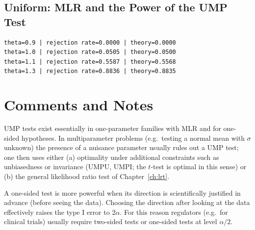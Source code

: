 \documentclass[main.tex]{subfiles}
\begin{document}
\subsection{Uniform: MLR and the Power of the UMP Test}

\begin{lstlisting}[style=output]
theta=0.9 | rejection rate=0.0000 | theory=0.0000
theta=1.0 | rejection rate=0.0505 | theory=0.0500
theta=1.1 | rejection rate=0.5587 | theory=0.5568
theta=1.3 | rejection rate=0.8836 | theory=0.8835
\end{lstlisting}

\section{Comments and Notes}

\begin{remark}
UMP tests exist essentially in one-parameter families with MLR and for one-sided hypotheses. In multiparameter problems (e.g.\ testing a normal mean with $\sigma$ unknown) the presence of a nuisance parameter usually rules out a UMP test; one then uses either (a) optimality under additional constraints such as unbiasedness or invariance (UMPU, UMPI; the $t$-test is optimal in this sense) or (b) the general likelihood ratio test of Chapter~\ref{ch:lrt}.
\end{remark}

\begin{remark}
A one-sided test is more powerful when its direction is scientifically justified in advance (before seeing the data). Choosing the direction after looking at the data effectively raises the type I error to $2\alpha$. For this reason regulators (e.g.\ for clinical trials) usually require two-sided tests or one-sided tests at level $\alpha/2$.
\end{remark}

\end{document}
